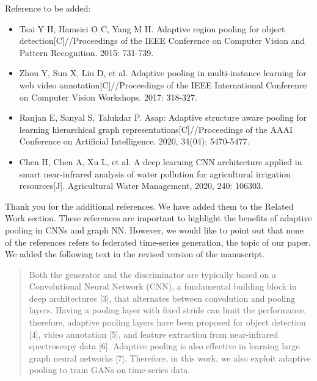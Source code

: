 \documentclass{article}
\begin{document}

\RC Reference to be added:
\begin{itemize}
	\item Tsai Y H, Hamsici O C, Yang M H. Adaptive region pooling for object detection[C]//Proceedings of the IEEE Conference on Computer Vision and Pattern Recognition. 2015: 731-739.
	\item Zhou Y, Sun X, Liu D, et al. Adaptive pooling in multi-instance learning for web video annotation[C]//Proceedings of the IEEE International Conference on Computer Vision Workshops. 2017: 318-327.
	\item Ranjan E, Sanyal S, Talukdar P. Asap: Adaptive structure aware pooling for learning hierarchical graph representations[C]//Proceedings of the AAAI Conference on Artificial Intelligence. 2020, 34(04): 5470-5477.
	\item Chen H, Chen A, Xu L, et al. A deep learning CNN architecture applied in smart near-infrared analysis of water pollution for agricultural irrigation resources[J]. Agricultural Water Management, 2020, 240: 106303.
\end{itemize}

\AR Thank you for the additional references. We have added them to the Related Work section. These references are important to highlight the benefits of adaptive pooling in CNNs and graph NN. However, we would like to point out that none of the references refers to federated time-series generation, the topic of our paper. \newline
We added the following text in the revised version of the manuscript.

\begin{quote}
Both the generator and the discriminator are typically based on a Convolutional Neural Network
(CNN), a fundamental building block in deep architectures [3], that alternates between convolution and pooling layers. Having a pooling layer with fixed stride can limit the performance, therefore, adaptive pooling layers have been proposed for object detection [4], video annotation [5], and feature extraction from near-infrared spectroscopy data [6]. Adaptive pooling is also effective in learning large graph neural networks [7]. Therefore, in this work, we also exploit adaptive pooling to
train GANs on time-series data.
\end{quote}
\end{document}
